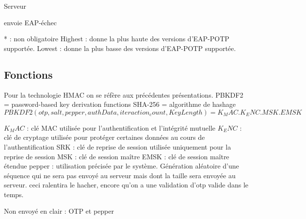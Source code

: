\documentclass{article}
\begin{document}
\begin{flushleft}
\begin{algorithm}
	\caption{Serveur}
	\label{TOTP:verif}
\begin{algorithmic}
	\STATE envoie EAP-échec
\ENDIF

\end{algorithmic}
\end{algorithm}
\end{flushleft}






* : non obligatoire
 Highest : donne la plus haute des versions d'EAP-POTP supportée.
 Lowest :  donne la plus basse des versions d'EAP-POTP supportée.

\subsection{Fonctions}
Pour la technologie HMAC on se réfère aux précédentes présentations.
PBKDF2 = password-based key derivation functions
SHA-256 = algorithme de hashage
$PBKDF2(otp,salt,pepper,authData,iteraction_count,Key Length) = K_MAC.K_ENC.MSK.EMSK$


$K_MAC$ : clé MAC utilisée pour l'authentification et l'intégrité mutuelle
$K_ENC$ : clé de cryptage utilisée pour protéger certaines données au cours de l'authentification
SRK : clé de reprise de session utilisée uniquement pour la reprise de session
MSK : clé de session maître
EMSK : clé de session maître étendue
pepper : utilisation précisée par le système. Génération aléatoire d'une séquence qui ne sera pas envoyé au serveur mais dont la taille sera envoyée au serveur. ceci ralentira le hacher, encore qu'on a une validation d'otp valide dans le temps.

Non envoyé en clair : OTP et pepper
\end{document}
